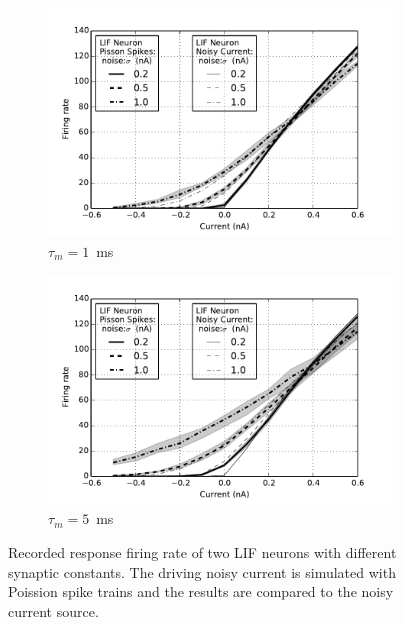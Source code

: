 	\begin{figure}[bt!]
		\centering
		\begin{subfigure}[t]{0.45\textwidth}
			\includegraphics[width=\textwidth]{pics_iconip/3-1.pdf}
		    \caption{$\tau_m=1$~ms}
		    \label{Fig:lif_pois1}
		\end{subfigure}
		\begin{subfigure}[t]{0.45\textwidth}
			\includegraphics[width=\textwidth]{pics_iconip/3-2.pdf}
		    \caption{$\tau_m=5$~ms}
		    \label{Fig:lif_pois5}
		\end{subfigure}
		
		\caption{
			Recorded response firing rate of two LIF neurons with different synaptic constants.
			The driving noisy current is simulated with Poission spike trains and the results are compared to the noisy current source.}
		\label{fig:lif_pois}	
	\end{figure}
	
